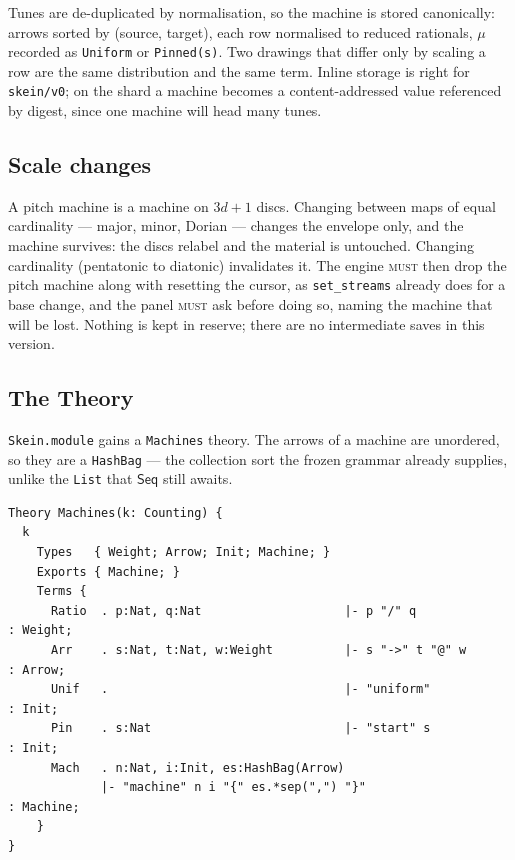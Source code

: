 \documentclass[11pt,a4paper]{article}
\newcommand{\MUST}{\textsc{must}}
\theoremstyle{definition}
\theoremstyle{plain}
\theoremstyle{remark}
\begin{document}
Tunes are de-duplicated by normalisation, so the machine is stored canonically: arrows sorted by
(source, target), each row normalised to reduced rationals, $\mu$ recorded as \texttt{Uniform} or
\texttt{Pinned(s)}. Two drawings that differ only by scaling a row are the same distribution and the
same term. Inline storage is right for \texttt{skein/v0}; on the shard a machine becomes a
content-addressed value referenced by digest, since one machine will head many tunes.

\subsection{Scale changes}

A pitch machine is a machine on $3d+1$ discs. Changing between maps of equal cardinality --- major,
minor, Dorian --- changes the envelope only, and the machine survives: the discs relabel and the
material is untouched. Changing cardinality (pentatonic to diatonic) invalidates it. The engine
\MUST{} then drop the pitch machine along with resetting the cursor, as \texttt{set\_streams}
already does for a base change, and the panel \MUST{} ask before doing so, naming the machine that
will be lost. Nothing is kept in reserve; there are no intermediate saves in this version.

\subsection{The Theory}

\texttt{Skein.module} gains a \texttt{Machines} theory. The arrows of a machine are unordered, so
they are a \texttt{HashBag} --- the collection sort the frozen grammar already supplies, unlike the
\texttt{List} that $\mathsf{Seq}$ still awaits.

\begin{lstlisting}
Theory Machines(k: Counting) {
  k
    Types   { Weight; Arrow; Init; Machine; }
    Exports { Machine; }
    Terms {
      Ratio  . p:Nat, q:Nat                    |- p "/" q                        : Weight;
      Arr    . s:Nat, t:Nat, w:Weight          |- s "->" t "@" w                 : Arrow;
      Unif   .                                 |- "uniform"                      : Init;
      Pin    . s:Nat                           |- "start" s                      : Init;
      Mach   . n:Nat, i:Init, es:HashBag(Arrow)
             |- "machine" n i "{" es.*sep(",") "}"                            : Machine;
    }
}
\end{lstlisting}
\end{document}
